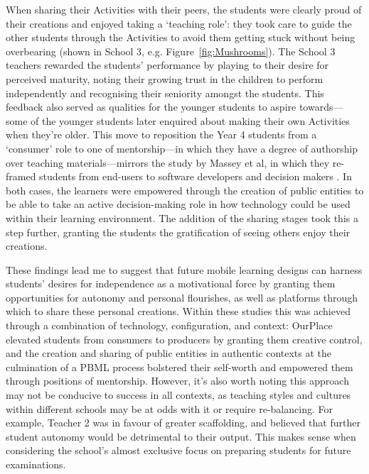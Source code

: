 When sharing their Activities with their peers, the students were clearly proud of their creations and enjoyed taking a `teaching role': they took care to guide the other students through the Activities to avoid them getting stuck without being overbearing (shown in School 3, e.g. Figure~\ref{fig:Mushrooms}). The School 3 teachers rewarded the students' performance by playing to their desire for perceived maturity, noting their growing trust in the children to perform independently and recognising their seniority amongst the students. This feedback also served as qualities for the younger students to aspire towards---some of the younger students later enquired about making their own Activities when they're older. This move to reposition the Year 4 students from a `consumer' role to one of mentorship---in which they have a degree of authorship over teaching materials---mirrors the study by Massey et al, in which they re-framed students from end-users to software developers and decision makers \citep{Massey2006}. In both cases, the learners were empowered through the creation of public entities to be able to take an active decision-making role in how technology could be used within their learning environment. The addition of the sharing stages took this a step further, granting the students the gratification of seeing others enjoy their creations.
 
These findings lead me to suggest that future mobile learning designs can harness students' desires for independence as a motivational force by granting them opportunities for autonomy and personal flourishes, as well as platforms through which to share these personal creations. Within these studies this was achieved through a combination of technology, configuration, and context: OurPlace elevated students from consumers to producers by granting them creative control, and the creation and sharing of public entities in authentic contexts at the culmination of a PBML process bolstered their self-worth and empowered them through positions of mentorship. However, it's also worth noting this approach may not be conducive to success in all contexts, as teaching styles and cultures within different schools may be at odds with it or require re-balancing. For example, Teacher 2 was in favour of greater scaffolding, and believed that further student autonomy would be detrimental to their output. This makes sense when considering the school's almost exclusive focus on preparing students for future examinations. 


